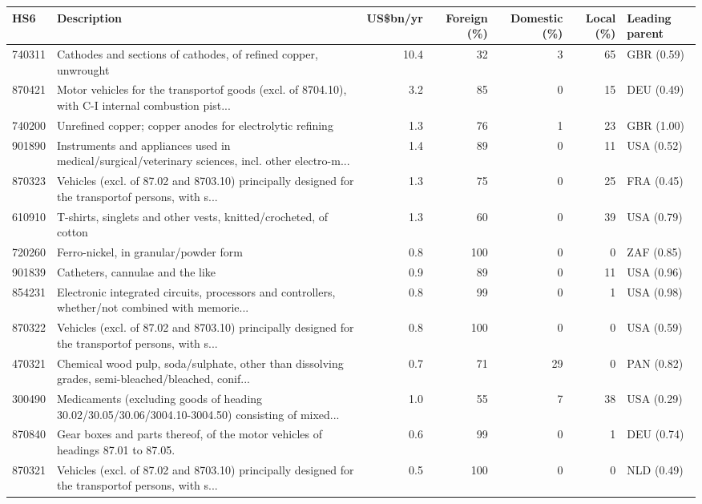 \begin{tabular}{@{}l p{6.4cm} r r r r l@{}}
\toprule
HS6 & Description & US\$bn/yr & Foreign (\%) & Domestic (\%) & Local (\%) & Leading parent \\
\midrule
740311 & Cathodes and sections of cathodes, of refined copper, unwrought & 10.4 & 32 & 3 & 65 & GBR (0.59) \\
870421 & Motor vehicles for the transportof goods (excl. of 8704.10), with C-I internal combustion pist... & 3.2 & 85 & 0 & 15 & DEU (0.49) \\
740200 & Unrefined copper; copper anodes for electrolytic refining & 1.3 & 76 & 1 & 23 & GBR (1.00) \\
901890 & Instruments and appliances used in medical/\allowbreak{}surgical/\allowbreak{}veterinary sciences, incl. other electro-m... & 1.4 & 89 & 0 & 11 & USA (0.52) \\
870323 & Vehicles (excl. of 87.02 and 8703.10) principally designed for the transportof persons, with s... & 1.3 & 75 & 0 & 25 & FRA (0.45) \\
610910 & T-shirts, singlets and other vests, knitted/\allowbreak{}crocheted, of cotton & 1.3 & 60 & 0 & 39 & USA (0.79) \\
720260 & Ferro-nickel, in granular/\allowbreak{}powder form & 0.8 & 100 & 0 & 0 & ZAF (0.85) \\
901839 & Catheters, cannulae and the like & 0.9 & 89 & 0 & 11 & USA (0.96) \\
854231 & Electronic integrated  circuits, processors and controllers, whether/\allowbreak{}not combined with memorie... & 0.8 & 99 & 0 & 1 & USA (0.98) \\
870322 & Vehicles (excl. of 87.02 and 8703.10) principally designed for the transportof persons, with s... & 0.8 & 100 & 0 & 0 & USA (0.59) \\
470321 & Chemical wood pulp, soda/\allowbreak{}sulphate, other than dissolving grades, semi-bleached/\allowbreak{}bleached, conif... & 0.7 & 71 & 29 & 0 & PAN (0.82) \\
300490 & Medicaments (excluding goods of heading 30.02/\allowbreak{}30.05/\allowbreak{}30.06/\allowbreak{}3004.10-3004.50) consisting of mixed... & 1.0 & 55 & 7 & 38 & USA (0.29) \\
870840 & Gear boxes and parts thereof, of the motor vehicles of headings 87.01 to 87.05. & 0.6 & 99 & 0 & 1 & DEU (0.74) \\
870321 & Vehicles (excl. of 87.02 and 8703.10) principally designed for the transportof persons, with s... & 0.5 & 100 & 0 & 0 & NLD (0.49) \\

\end{tabular}
